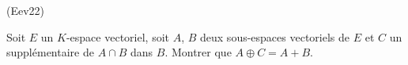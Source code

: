 \begin{tiny}(Eev22)\end{tiny} Soit $E$ un $K$-espace vectoriel, soit $A$, $B$ deux sous-espaces vectoriels de $E$ et $C$ un supplémentaire de $A\cap B$ dans $B$. Montrer que $A \oplus C =A+B$.
